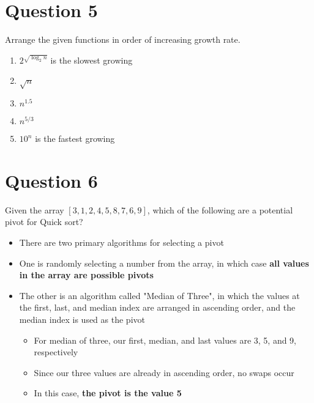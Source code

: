 \documentclass{article}
\begin{document}
    \section{Question 5}
    Arrange the given functions in order of increasing growth rate.
        \begin{enumerate}
            \item{$2^{\sqrt{\log_2 n}}$ is the slowest growing}
            \item{$\sqrt n$}
            \item{$n^{1.5}$}
            \item{$n^{5/3}$}
            \item{$10^n$ is the fastest growing}
        \end{enumerate}

    \section{Question 6}
    Given the array $[3, 1, 2, 4, 5, 8, 7, 6, 9]$, which of the following are a potential pivot for Quick sort?
        \begin{itemize}
            \item{There are two primary algorithms for selecting a pivot}
            \item{One is randomly selecting a number from the array, in which case \textbf{all values in the array are possible pivots}}
            \item{The other is an algorithm called "Median of Three", in which the values at the first, last, and median index are arranged in ascending order, and the median index is used as the pivot}
            \begin{itemize}
				\item{For median of three, our first, median, and last values are 3, 5, and 9, respectively}
           		\item{Since our three values are already in ascending order, no swaps occur}
           		\item{In this case, \textbf{the pivot is the value 5}}
            \end{itemize}
        \end{itemize}
\end{document}
